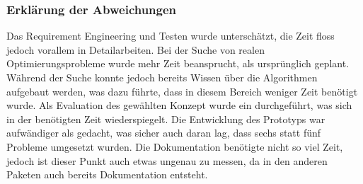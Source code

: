 \subsubsection{Erklärung der Abweichungen}
Das Requirement Engineering und Testen wurde unterschätzt, die Zeit floss jedoch vorallem in Detailarbeiten. Bei der Suche von realen Optimierungsprobleme wurde mehr Zeit beansprucht, als
ursprünglich geplant. Während der Suche konnte jedoch bereits Wissen über die Algorithmen aufgebaut werden, was dazu führte, dass in diesem Bereich weniger Zeit benötigt wurde. Als 
Evaluation des gewählten Konzept wurde ein  durchgeführt, was sich in der benötigten Zeit wiederspiegelt. Die Entwicklung des Prototyps war aufwändiger 
als gedacht, was sicher auch daran lag, dass sechs statt fünf Probleme umgesetzt wurden. Die Dokumentation benötigte nicht so viel Zeit, jedoch ist dieser Punkt auch etwas ungenau zu 
messen, da in den anderen Paketen auch bereits Dokumentation entsteht.
